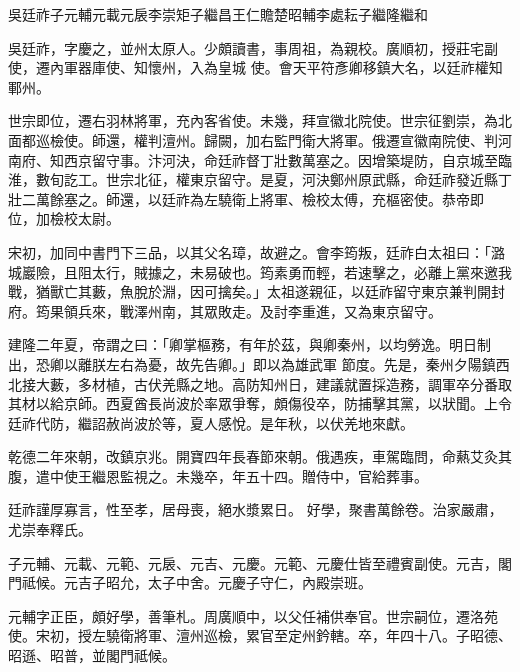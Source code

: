 
\begin{pinyinscope}

 吳廷祚子元輔元載元扆李崇矩子繼昌王仁贍楚昭輔李處耘子繼隆繼和



 吳廷祚，字慶之，並州太原人。少頗讀書，事周祖，為親校。廣順初，授莊宅副使，遷內軍器庫使、知懷州，入為皇城
 使。會天平符彥卿移鎮大名，以廷祚權知鄆州。



 世宗即位，遷右羽林將軍，充內客省使。未幾，拜宣徽北院使。世宗征劉崇，為北面都巡檢使。師還，權判澶州。歸闕，加右監門衛大將軍。俄遷宣徽南院使、判河南府、知西京留守事。汴河決，命廷祚督丁壯數萬塞之。因增築堤防，自京城至臨淮，數旬訖工。世宗北征，權東京留守。是夏，河決鄭州原武縣，命廷祚發近縣丁壯二萬餘塞之。師還，以廷祚為左驍衛上將軍、檢校太傅，充樞密使。恭帝即
 位，加檢校太尉。



 宋初，加同中書門下三品，以其父名璋，故避之。會李筠叛，廷祚白太祖曰：「潞城巖險，且阻太行，賊據之，未易破也。筠素勇而輕，若速擊之，必離上黨來邀我戰，猶獸亡其藪，魚脫於淵，因可擒矣。」太祖遂親征，以廷祚留守東京兼判開封府。筠果領兵來，戰澤州南，其眾敗走。及討李重進，又為東京留守。



 建隆二年夏，帝謂之曰：「卿掌樞務，有年於茲，與卿秦州，以均勞逸。明日制出，恐卿以離朕左右為憂，故先告卿。」即以為雄武軍
 節度。先是，秦州夕陽鎮西北接大藪，多材植，古伏羌縣之地。高防知州日，建議就置採造務，調軍卒分番取其材以給京師。西夏酋長尚波於率眾爭奪，頗傷役卒，防捕擊其黨，以狀聞。上令廷祚代防，繼詔赦尚波於等，夏人感悅。是年秋，以伏羌地來獻。



 乾德二年來朝，改鎮京兆。開寶四年長春節來朝。俄遇疾，車駕臨問，命爇艾灸其腹，遣中使王繼恩監視之。未幾卒，年五十四。贈侍中，官給葬事。



 廷祚謹厚寡言，性至孝，居母喪，絕水漿累日。
 好學，聚書萬餘卷。治家嚴肅，尤崇奉釋氏。



 子元輔、元載、元範、元扆、元吉、元慶。元範、元慶仕皆至禮賓副使。元吉，閣門祗候。元吉子昭允，太子中舍。元慶子守仁，內殿崇班。



 元輔字正臣，頗好學，善筆札。周廣順中，以父任補供奉官。世宗嗣位，遷洛苑使。宋初，授左驍衛將軍、澶州巡檢，累官至定州鈐轄。卒，年四十八。子昭德、昭遜、昭普，並閣門祗候。




\end{pinyinscope}
